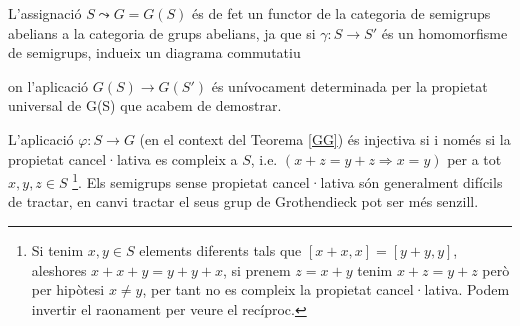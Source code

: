  \begin{obs}
 L'assignació $S \leadsto G=G(S)$ és de fet un functor de la categoria de semigrups abelians a la categoria de grups abelians, ja que si $\gamma: S \rightarrow S'$ és un homomorfisme de semigrups, indueix un diagrama commutatiu
\begin{center}
\end{center}
 on l'aplicació $G(S)\rightarrow G(S')$ és unívocament determinada per la propietat universal de G(S) que acabem de demostrar.
 

\end{obs}
\begin{obs}
 L'aplicació $\varphi: S \rightarrow G$ (en el context del Teorema \ref{GG}) és injectiva si i només si la propietat cancel·lativa es compleix a $S$, i.e. $(x+z=y+z \Rightarrow x=y)$ per a tot $x,y,z\in S$
\footnote{
Si tenim $x,y\in S$ elements diferents tals que $[x+x,x]=[y+y,y]$, aleshores $x+x+y=y+y+x$, si prenem $z=x+y$ tenim $x+z=y+z$ però per hipòtesi $x\neq y$, per tant no es compleix la propietat cancel·lativa. Podem invertir el raonament per veure el recíproc.}. Els semigrups sense propietat cancel·lativa són generalment difícils de tractar, en canvi tractar el seus grup de Grothendieck pot ser més senzill.
 \end{obs}

